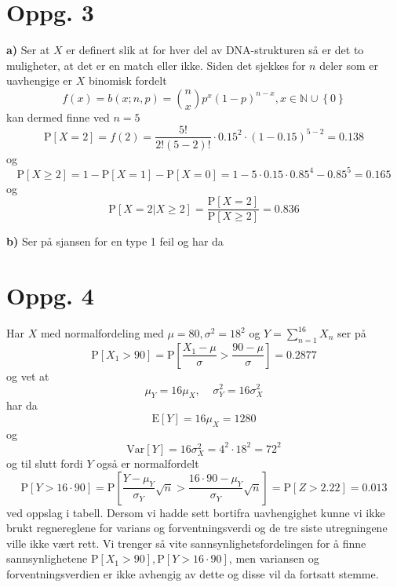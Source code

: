 \documentclass{report}
\newcommand{\M}[2]{\mathbb{#1}^{#2}}
\newcommand{\bbrack}[1]{\left[ #1 \right]}
\newcommand{\cbrack}[1]{\left\lbrace #1 \right\rbrace}
\newcommand{\Var}[1]{\text{Var} \bbrack{ #1 }}
\newcommand{\std}[1]{\text{E} \bbrack{ #1 }}
\newcommand{\Prob}[1]{\text{P} \bbrack{ #1 }}
\begin{document}
\section*{Oppg. 3}
\textbf{a)}
Ser at $X$ er definert slik at for hver del av DNA-strukturen så er det to muligheter, at det er en match eller ikke. Siden det sjekkes for $n$ deler som er uavhengige er $X$ binomisk fordelt
\begin{equation}
  \label{eq:4}
  f(x) = b(x; n, p) = \binom{n}{x} p^{x}(1-p)^{n-x}, x \in \M{N}{} \cup \cbrack{0}
\end{equation}
kan dermed finne ved $n=5$
\begin{equation}
  \label{eq:14}
  \Prob{X=2} = f(2) = \frac{5!}{2!(5-2)!} \cdot 0.15^{2} \cdot (1-0.15)^{5-2} = 0.138
\end{equation}
og
\begin{equation}
  \label{eq:15}
  \Prob{X \geq 2} = 1 - \Prob{X=1} - \Prob{X=0} = 1 - 5\cdot 0.15 \cdot 0.85^{4} - 0.85^{5} = 0.165
\end{equation}
og
\begin{equation}
  \label{eq:16}
  \Prob{X = 2 | X \geq 2} = \frac{\Prob{X=2}}{\Prob{X \geq 2}} = 0.836
\end{equation}

\textbf{b)}
Ser på sjansen for en type 1 feil og har da



\section*{Oppg. 4}
Har $X$ med normalfordeling med $\mu = 80, \sigma^{2} = 18^{2}$ og $Y = \sum_{n=1}^{16} X_{n}$ ser på
\begin{equation}
  \label{eq:17}
  \Prob{X_{1} > 90} = \Prob{\frac{X_{1} - \mu}{\sigma} > \frac{90-\mu}{\sigma}} = 0.2877
\end{equation}
og vet at
\begin{equation}
  \label{eq:21}
  \mu_{Y} = 16 \mu_{X}, \;\;\;\; \sigma_{Y}^{2} = 16\sigma_{X}^{2}
\end{equation}
har da
\begin{equation}
  \label{eq:22}
  \std{Y} = 16\mu_{X} = 1280
\end{equation}
og
\begin{equation}
  \label{eq:23}
  \Var{Y} = 16\sigma_{X}^{2} = 4^{2} \cdot 18^{2} = 72^{2}
\end{equation}
og til slutt fordi $Y$ også er normalfordelt
\begin{equation}
  \label{eq:28}
  \Prob{Y > 16\cdot 90} = \Prob{\frac{Y-\mu_{Y}}{\sigma_{Y}}\sqrt{n} > \frac{16\cdot 90 - \mu_{Y}}{\sigma_{Y}}\sqrt{n}} = \Prob{Z > 2.22} = 0.013
\end{equation}
ved oppslag i tabell. Dersom vi hadde sett bortifra uavhengighet kunne vi ikke brukt regnereglene for varians og forventningsverdi og de tre siste utregningene ville ikke vært rett. Vi trenger så vite sannsynlighetsfordelingen for å finne sannsynlighetene $\Prob{X_{1} > 90}, \Prob{Y > 16\cdot 90}$, men variansen og forventningsverdien er ikke avhengig av dette og disse vil da fortsatt stemme.
\end{document}
